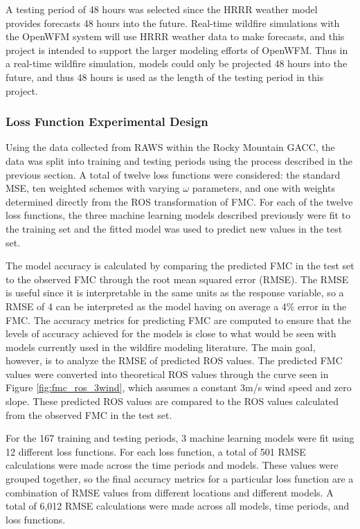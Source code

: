 \documentclass[11pt]{article}%
\begin{document}
A testing period of 48 hours was selected since the HRRR weather model provides forecasts 48 hours into the future. Real-time wildfire simulations with the OpenWFM system will use HRRR weather data to make forecasts, and this project is intended to support the larger modeling efforts of OpenWFM. Thus in a real-time wildfire simulation, models could only be projected 48 hours into the future, and thus 48 hours is used as the length of the testing period in this project.

\subsubsection{Loss Function Experimental Design}
\hfill

Using the data collected from RAWS within the Rocky Mountain GACC, the data was split into training and testing periods using the process described in the previous section. A total of twelve loss functions were considered: the standard MSE, ten weighted schemes with varying $\omega$ parameters, and one with weights determined directly from the ROS transformation of FMC. For each of the twelve loss functions, the three machine learning models described previously were fit to the training set and the fitted model was used to predict new values in the test set. 

The model accuracy is calculated by comparing the predicted FMC in the test set to the observed FMC through the root mean squared error (RMSE). The RMSE is useful since it is interpretable in the same units as the response variable, so a RMSE of 4 can be interpreted as the model having on average a 4\% error in the FMC. The accuracy metrics for predicting FMC are computed to ensure that the levels of accuracy achieved for the models is close to what would be seen with models currently used in the wildfire modeling literature. The main goal, however, is to analyze the RMSE of predicted ROS values. The predicted FMC values were converted into theoretical ROS values through the curve seen in Figure \ref{fig:fmc_ros_3wind}, which assumes a constant 3m/s wind speed and zero slope. These predicted ROS values are compared to the ROS values calculated from the observed FMC in the test set.

For the 167 training and testing periods, 3 machine learning models were fit using 12 different loss functions. For each loss function, a total of 501 RMSE calculations were made across the time periods and models. These values were grouped together, so the final accuracy metrics for a particular loss function are a combination of RMSE values from different locations and different models. A total of 6,012 RMSE calculations were made across all models, time periods, and loss functions.
\end{document}
